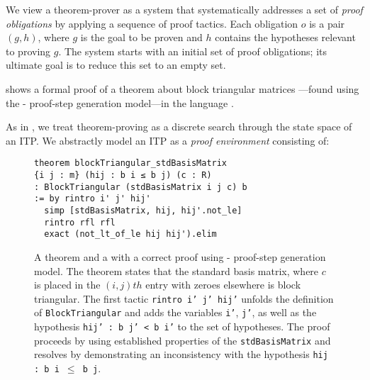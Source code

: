 \newcommand{\init}{\mathit{in}}
\newcommand{\error}{\mathit{error}}
\newcommand{\leqhard}{\sqsubseteq}
\newcommand{\geqhard}{\sqsupseteq}
\newcommand{\QED}{\mathtt{QED}}
\newcommand{\Ob}{\mathcal{O}}
\newcommand{\Ib}{\mathcal{I}}
\newcommand{\glob}{\chi} 
\renewcommand{\error}{\mathit{Err}}

\newcommand{\edge}[1]{\stackrel{#1}{\longrightarrow}}

We view a theorem-prover as a system that systematically addresses a set of \emph{proof obligations} by applying a sequence of proof tactics.
Each obligation $o$ is a pair $(g, h)$, where $g$ is the goal to be proven and $h$ contains the hypotheses relevant to proving $g$. The system starts with an initial set of proof obligations; its ultimate goal is to reduce this set to an empty set. 
 
 shows a formal proof of a theorem about block triangular matrices ---found using the \proofwala-\multi\; proof-step generation model---in the \lean{} language \citep{de2015lean}.

As in \citet{thakur2024incontext}, we treat theorem-proving as a discrete search through the state space of an ITP. We abstractly model an ITP as a \emph{proof environment} consisting of:
\begin{figure}
\begin{mdframed}[roundcorner=10pt]
\begin{minipage}{0.9\textwidth}
\begin{lstlisting}
theorem blockTriangular_stdBasisMatrix 
{i j : m} (hij : b i ≤ b j) (c : R) 
: BlockTriangular (stdBasisMatrix i j c) b  
:= by rintro i' j' hij'
  simp [stdBasisMatrix, hij, hij'.not_le]
  rintro rfl rfl
  exact (not_lt_of_le hij hij').elim
\end{lstlisting}
\end{minipage}
\end{mdframed}
\vspace{-0.1in}
\caption{A \lean{} theorem and a with a correct proof using \proofwala-\multi\; proof-step generation model. The theorem states that the standard basis matrix, where $c$ is placed in the $(i,j)th$ entry with zeroes elsewhere is block triangular. The first tactic \texttt{rintro i' j' hij'} unfolds the definition of \texttt{BlockTriangular} and adds the variables \texttt{i'}, \texttt{j'}, as well as the hypothesis \texttt{hij' : b j' < b i'} to the set of hypotheses. The proof proceeds by using established properties of the \texttt{stdBasisMatrix} and resolves by demonstrating an inconsistency with the hypothesis \texttt{hij : b i $\leq$ b j}.}
\label{fig:example}
\end{figure}

